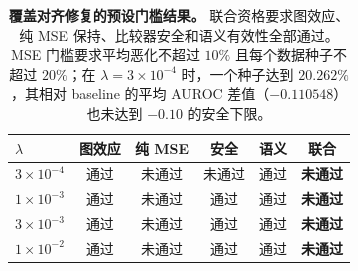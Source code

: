 \begin{table}[H]
\centering
\caption{\textbf{覆盖对齐修复的预设门槛结果。} 联合资格要求图效应、纯 MSE 保持、比较器安全和语义有效性全部通过。MSE 门槛要求平均恶化不超过 $10\%$ 且每个数据种子不超过 $20\%$；在 $\lambda=3\times10^{-4}$ 时，一个种子达到 $20.262\%$，其相对 baseline 的平均 AUROC 差值（$-0.110548$）也未达到 $-0.10$ 的安全下限。}
\label{tab:repair_gates}
\footnotesize
\setlength{\tabcolsep}{5pt}
\begin{tabular}{lccccc}
\toprule
$\lambda$ & 图效应 & 纯 MSE & 安全 & 语义 & 联合 \\
\midrule
$3\times10^{-4}$ & 通过 & 未通过 & 未通过 & 通过 & \textbf{未通过} \\
$1\times10^{-3}$ & 通过 & 未通过 & 通过 & 通过 & \textbf{未通过} \\
$3\times10^{-3}$ & 通过 & 未通过 & 通过 & 通过 & \textbf{未通过} \\
$1\times10^{-2}$ & 通过 & 未通过 & 通过 & 通过 & \textbf{未通过} \\
\bottomrule
\end{tabular}
\end{table}

